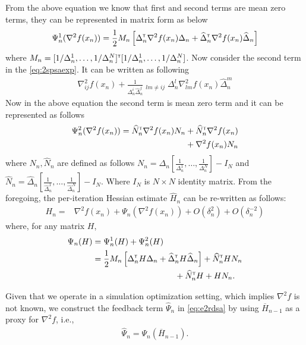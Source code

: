 \documentclass[twocolumn]{IEEEtran}
\begin{document}
From the above equation we know that first and second terms are mean zero terms, they can be represented in matrix form as below
\begin{align}
\Psi_n^1(\nabla^2 f(x_n)) =\frac{1}{2} M_n \left[\Delta_n^\mathsf{\scriptscriptstyle T} \nabla^2 f(x_n) \Delta_n + \widehat\Delta_n^\mathsf{\scriptscriptstyle T} \nabla^2 f(x_n) \widehat\Delta_n\right]
\end{align}
where $M_n = [1/\Delta_n^1, \ldots ,1/\Delta_n^N]^\mathsf{\scriptscriptstyle T} [1/\Delta_n^1, \ldots ,1/\Delta_n^N]$.
Now consider the second term in the \eqref{eq:2spsaexp}. It can be written as following 
\begin{align}
\nabla^2_{ij} f(x_n) + \frac{1}{\Delta_n^i \widehat\Delta_n^j} \mathop{\sum_{l=1}^N \sum_{m=1}^{N}}_{lm \neq ij} \Delta_n^l \nabla^2_{lm} f(x_n) \widehat\Delta_n^m
\end{align}
Now in the above equation the second term is mean zero term and it can be represented as follows
\begin{align}
\Psi_n^2(\nabla^2 f(x_n)) = \widehat N_n^\mathsf{\scriptscriptstyle T} \nabla^2 f(x_n) N_n  &+ \widehat N_n^\mathsf{\scriptscriptstyle T} \nabla^2 f(x_n) \nonumber\\ &+ \nabla^2 f(x_n) N_n
\end{align}
where $N_n,\widehat N_n$ are defined as follows $N_n = \Delta_n \left[\frac{1}{\Delta_n^1},\ldots,\frac{1}{\Delta_n^N}\right] - I_N$ and $\widehat N_n = \widehat \Delta_n \left [\frac{1}{\widehat\Delta_n^1},\ldots,\frac{1}{\widehat \Delta_n^N}\right] - I_N$. Where $I_N$ is $N \times N$ identity matrix.
From the foregoing, the per-iteration Hessian estimate $\widehat H_n$ can be re-written as follows:
\begin{align}
H_n = & \nabla^2 f(x_n) + \Psi_{n}(\nabla^2 f(x_n)) +  O(\delta_n^2) + O(\delta_n^{-2})  \label{eq:spsahnhat}
\end{align}
where, for any matrix $H$, 
\begin{align}
\Psi_{n}(H) &=  \Psi_{n}^{1}(H) + \Psi_{n}^{2}(H)\nonumber\\
&=  \frac{1}{2}M_n \left[\Delta_n\tr H \Delta_n + \widehat\Delta_n\tr H \widehat\Delta_n\right] + \widehat N_n\tr H N_n  \nonumber\\ & \hspace{3.5cm}+ \widehat N_n\tr H + H N_n.\label{eq:spsapsi}
\end{align}



Given that we operate in a simulation optimization setting, which implies $\nabla^2 f$ is not known, we construct the feedback term $\widehat \Psi_n$ in \eqref{eq:e2rdsa} by using $\overline H_{n-1}$ as a proxy for $\nabla^2 f$, i.e.,
\begin{align}
\widehat \Psi_n = \Psi_{n} (\overline H_{n-1}).
\end{align}
\end{document}
